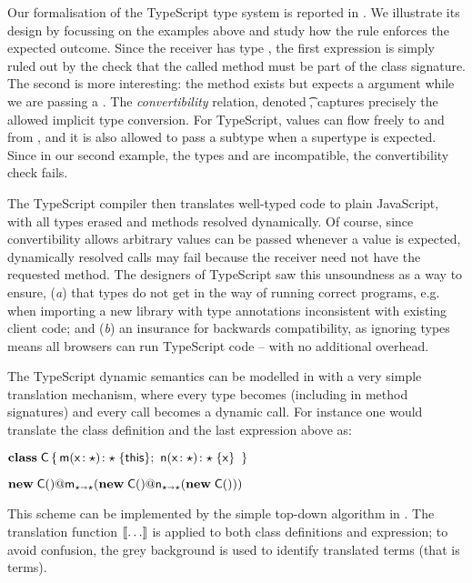 \documentclass[acmlarge, anonymous, authordraft, review]{acmart} %
\begin{document}
\noindent
Our formalisation of the TypeScript type system is reported in .  We illustrate its design by focussing on the examples above and study how the  rule enforces the expected outcome.  Since the receiver has type \C, the first expression is simply ruled out by the check that the called method must be part of the class signature.  The second is more interesting: the method exists but expects a \D argument while we are passing a \C.  The \emph{convertibility} relation, denoted   \ConvertE{}\t\tp, captures precisely the allowed implicit type conversion.  For TypeScript, values can flow freely to and from \any, and it is also allowed to pass a subtype when a supertype is expected.  Since in our second example, the types \C and \D are incompatible, the convertibility check fails.

The TypeScript compiler then translates well-typed code to plain JavaScript, with all types erased and methods resolved dynamically. Of course, since convertibility allows arbitrary values can be passed whenever a \any value is expected, dynamically resolved calls may fail because the receiver need not have the requested method. The designers of TypeScript saw this unsoundness as a way to
ensure, ({\em a}) that types do not get in the way of running correct
programs, e.g. when importing a new library with type annotations
inconsistent with existing client code; and ({\em b}) an insurance for
backwards compatibility, as ignoring types means all browsers can run
TypeScript code -- with no additional overhead.


\newcommand{\TR}[1]{\EM{\llbracket    #1 \rrbracket}}
\newcommand{\TA}[1]{\EM{\llparenthesis 2 \rrparenthesis}}

\newcommand{\TRG}[2]{\EM{\llbracket    #1 \rrbracket_{#2}}}
\newcommand{\TAG}[3]{\EM{\llparenthesis #1 \rrparenthesis_{#2}^{#3}}}

The TypeScript dynamic semantics can be modelled in \kafka with a very simple translation mechanism, where every
type becomes \any  (including in method signatures) and every call becomes a dynamic call.  
For instance one would translate the class
definition and the last expression above as:

\medskip
\(
\Class \C {   \Mdef\m\x\any\any \this  ; \   \Mdef\n\x\any\any \x }
\)

\medskip

\(\DynCall {\New \C{}} \m {\DynCall {\New \C{}} \n {\New \C{}}} \)


\medskip
\noindent This  scheme can be implemented by the simple top-down algorithm in .  The translation function \(\TR{\dots}\) is applied to both class definitions and expression; to avoid confusion, the grey background is used to identify translated terms (that is \kafka terms).  
\end{document}
